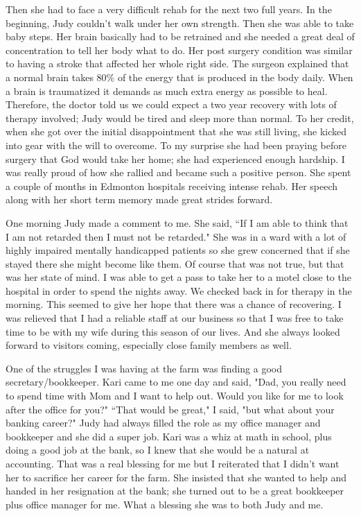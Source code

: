 \documentclass[oneside,12pt]{book}
\begin{document}
Then she had to face a very difficult rehab for the next two full years. In the beginning, Judy couldn't walk under her own strength. Then she was able to take baby steps. Her brain basically had to be retrained and she needed a great deal of concentration to tell her body what to do. Her post surgery condition was similar to having a stroke that affected her whole right side. The surgeon explained that a normal brain takes 80\% of the energy that is produced in the body daily. When a brain is traumatized it demands as much extra energy as possible to heal. Therefore, the doctor told us we could expect a two year recovery with lots of therapy involved; Judy would be tired and sleep more than normal. To her credit, when she got over the initial disappointment that she was still living, she kicked into gear with the will to overcome. To my surprise she had been praying before surgery that God would take her home; she had experienced enough hardship. I was really proud of how she rallied and became such a positive person. She spent a couple of months in Edmonton hospitals receiving intense rehab. Her speech along with her short term memory made great strides forward. 

One morning Judy made a comment to me. She said, ``If I am able to think that I am not retarded then I must not be retarded." She was in a ward with a lot of highly impaired mentally handicapped patients so she grew concerned that if she stayed there she might become like them. Of course that was not true, but that was her state of mind. I was able to get a pass to take her to a motel close to the hospital in order to spend the nights away.  We checked back in for therapy in the morning. This seemed to give her hope that there was a chance of recovering. I was relieved that I had a reliable staff at our business so that I was free to take time to be with my wife during this season of our lives. And she always looked forward to visitors coming, especially close family members as well.

One of the struggles I was having at the farm was finding a good secretary/bookkeeper. Kari came to me one day and said, "Dad, you really need to spend time with Mom and I want to help out. Would you like for me to look after the office for you?" ``That would be great," I said, "but what about your banking career?" Judy had always filled the role as my office manager and bookkeeper and she did a super job. Kari was a whiz at math in school, plus doing a good job at the bank, so I knew that she would be a natural at accounting. That was a real blessing for me but I reiterated that I didn't want her to sacrifice her career for the farm. She insisted that she wanted to help and handed in her resignation at the bank; she turned out to be a great bookkeeper plus office manager for me. What a blessing she was to both Judy and me.
\end{document}
